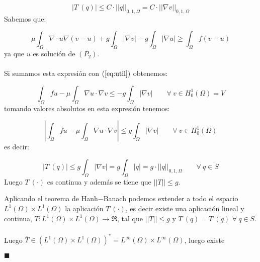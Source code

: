 \begin{demosteorema}
\begin{itemize}
\begin{displaymath}
|T\ (q)|\le C\cdot ||q||_{0,1,\Omega }=C\cdot ||\nabla v||_{0,1,\Omega }
\end{displaymath}
Sabemos que:

\begin{displaymath}
\mu \int_{\Omega }\nabla \cdot u\nabla (v-u) +g \int_{\Omega }
|\nabla v|-g \int_{\Omega }|\nabla u|\ge \int_{\Omega }f(v-u)
\end{displaymath}
ya que $u$ es soluci\'on de $(P_2)$.\\ \\
Si sumamos esta expresi\'on con $(\ref{eq:util})$ obtenemos:

\begin{displaymath}
\int_{\Omega }fu-\mu \int_{\Omega }\nabla u \cdot \nabla v \le
-g \int_{\Omega } |\nabla v|\qquad \forall \ v \in H^1_0(\Omega )=V
\end{displaymath}
tomando valores absolutos en esta expresi\'on tenemos:

\begin{displaymath}
|\int_{\Omega }fu -\mu \int_{\Omega }\nabla u\cdot \nabla v|\le
g \int_{\Omega }|\nabla v|\qquad \forall\ v\in H^1_0(\Omega )
\end{displaymath}
es decir:

\begin{displaymath}
|T\ (q)|\le g\int_{\Omega }|\nabla v| = g\int_{\Omega }|q|=g\cdot
||q||_{0,1,\Omega }\qquad \forall \ q\in S
\end{displaymath}
Luego $T\ (\cdot )$ es continua y adem\'as se tiene que $||T||\le g$.
\end{itemize}
Aplicando el teorema de Hanh$-$Banach podemos extender a todo el espacio
\mbox{$L^1(\Omega )\times L^1(\Omega )$} la aplicaci\'on $T\ (\cdot)$, es
decir existe una aplicaci\'on lineal y continua,
$\overline{T}:L^1(\Omega )\times L^1(\Omega )\longrightarrow \Re$, tal que
$||\overline{T}||\le g$ y $\overline{T}\ (q)=T\ (q)$ $\forall \ q \in S$.\\ \\
Luego $\overline{T}\in (L^1(\Omega )\times L^1(\Omega ))^*=
L^{\infty}(\Omega )\times L^{\infty}(\Omega )$, luego existe








\begin{flushright}
$\blacksquare$
\end{flushright}
\end{demosteorema}

